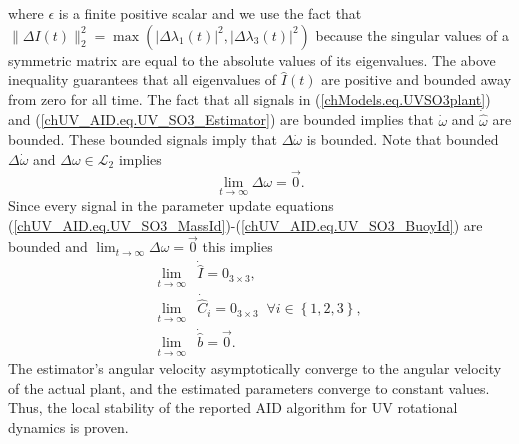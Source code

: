 %
where $\epsilon$ is a finite positive scalar and we use the fact that
$\|\Delta I(t)\|_2^2=\max(|\Delta \lambda_1(t)|^2,|\Delta
\lambda_3(t)|^2)$ because the singular values of a symmetric matrix
are equal to the absolute values of its eigenvalues.
%
The above inequality guarantees that all eigenvalues of $\hat{I}(t)$
are positive and bounded away from zero for all time. 
%
The fact that all signals in (\ref{chModels.eq.UVSO3plant}) and
(\ref{chUV_AID.eq.UV_SO3_Estimator}) are bounded implies that $\dot{\omega}$
and $\dot{\hat{\omega}}$ are bounded.  
%
These bounded signals imply that $\Delta \dot{\omega}$ is bounded.  
%
Note that bounded $\Delta \dot{\omega}$ and $\Delta \omega \in \mathcal{L}_2$
implies%
%
\begin{equation}
\lim_{t\to \infty}\Delta \omega=\vec{0}.
\end{equation}
%
Since every signal in the parameter update equations
(\ref{chUV_AID.eq.UV_SO3_MassId})-(\ref{chUV_AID.eq.UV_SO3_BuoyId})
are bounded and $\lim_{t\to \infty}\Delta \omega=\vec{0}$ this implies
%
\begin{align}
\lim_{t\to \infty}&\dot{\hat{I}}=0_{3 \times 3},
\nonumber \\
\lim_{t\to \infty}&\dot{\hat{C}}_i=0_{3 \times 3}\; \; \forall i\in\left\{1,2,3\right\},
\nonumber \\
\lim_{t\to \infty}&\dot{\hat{b}}=\vec{0}.
\end{align}
The estimator's angular velocity asymptotically converge to the
angular velocity of the actual plant, and the estimated parameters
converge to constant values.  Thus, the local stability of the
reported \ac{AID} algorithm for \ac{UV} rotational dynamics is proven.
